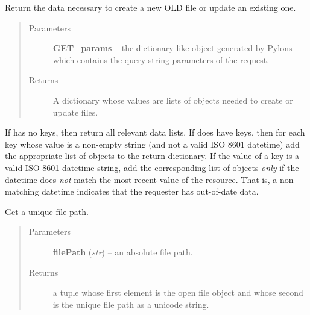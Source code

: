 \documentclass[letterpaper,10pt,english]{sphinxmanual}
\begin{document}

\begin{fulllineitems}
\label{api:onlinelinguisticdatabase.controllers.files.getNewEditFileData}
Return the data necessary to create a new OLD file or update an existing one.
\begin{quote}\begin{description}
\item[{Parameters}] \leavevmode
\textbf{GET\_params} -- the  dictionary-like object generated by
Pylons which contains the query string parameters of the request.

\item[{Returns}] \leavevmode
A dictionary whose values are lists of objects needed to create or
update files.

\end{description}\end{quote}

If  has no keys, then return all relevant data lists.  If
 does have keys, then for each key whose value is a non-empty
string (and not a valid ISO 8601 datetime) add the appropriate list of
objects to the return dictionary.  If the value of a key is a valid ISO 8601
datetime string, add the corresponding list of objects \emph{only} if the
datetime does \emph{not} match the most recent  value of the
resource.  That is, a non-matching datetime indicates that the requester has
out-of-date data.

\end{fulllineitems}


\begin{fulllineitems}
\label{api:onlinelinguisticdatabase.controllers.files.getUniqueFilePath}
Get a unique file path.
\begin{quote}\begin{description}
\item[{Parameters}] \leavevmode
\textbf{filePath} (\emph{str}) -- an absolute file path.

\item[{Returns}] \leavevmode
a tuple whose first element is the open file object and whose
second is the unique file path as a unicode string.

\end{description}\end{quote}

\end{fulllineitems}
\end{document}
